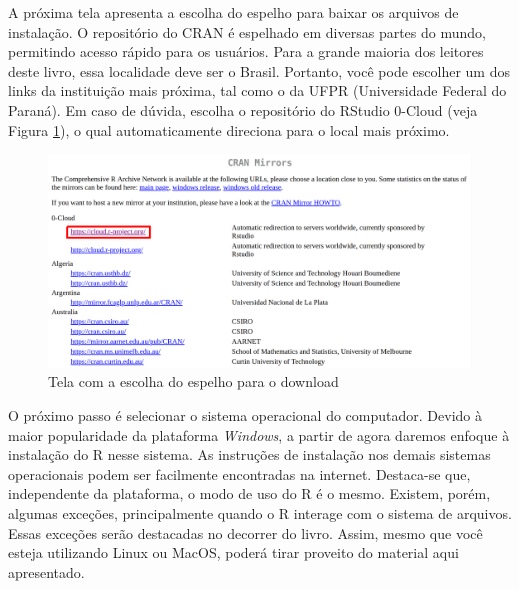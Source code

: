 \documentclass[
  11pt,
]{book}
\begin{document}
A próxima tela apresenta a escolha do espelho para baixar os arquivos de instalação. O repositório do CRAN é espelhado em diversas partes do mundo, permitindo acesso rápido para os usuários. Para a grande maioria dos leitores deste livro, essa localidade deve ser o Brasil. Portanto, você pode escolher um dos links da instituição mais próxima, tal como o da UFPR (Universidade Federal do Paraná). Em caso de dúvida, escolha o repositório do RStudio 0-Cloud (veja Figura \ref{fig:website-cran-2}), o qual automaticamente direciona para o local mais próximo.

\begin{figure}[!htbp]

{\centering \includegraphics[width=1\linewidth]{00-text-resources/figs/website_cran_2} 

}

\caption{Tela com a escolha do espelho para o download}\label{fig:website-cran-2}
\end{figure}

O próximo passo é selecionar o sistema operacional do computador. Devido à maior popularidade da plataforma \emph{Windows}, a partir de agora daremos enfoque à instalação do R nesse sistema. As instruções de instalação nos demais sistemas operacionais podem ser facilmente encontradas na internet. Destaca-se que, independente da plataforma, o modo de uso do R é o mesmo. Existem, porém, algumas exceções, principalmente quando o R interage com o sistema de arquivos. Essas exceções serão destacadas no decorrer do livro. Assim, mesmo que você esteja utilizando Linux ou MacOS, poderá tirar proveito do material aqui apresentado.
\end{document}
